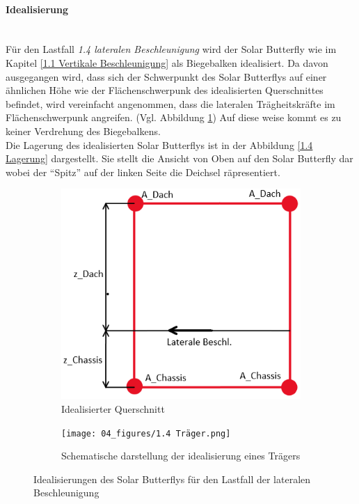   \paragraph{Idealisierung}\mbox{}\\
  Für den Lastfall \emph{1.4 lateralen Beschleunigung} wird der Solar Butterfly wie im Kapitel \ref{1.1 Vertikale Beschleunigung} als Biegebalken idealisiert. Da davon ausgegangen wird, dass sich der Schwerpunkt des Solar Butterflys auf einer ähnlichen Höhe wie der Flächenschwerpunk des idealisierten Querschnittes befindet, wird vereinfacht angenommen, dass die lateralen Trägheitskräfte im Flächenschwerpunk angreifen. (Vgl. Abbildung \ref{1.4 Idealisierter Querschnitt}) Auf diese weise kommt es zu keiner Verdrehung des Biegebalkens.\\
  Die Lagerung des idealisierten Solar Butterflys ist in der Abbildung \ref{1.4 Lagerung} dargestellt. Sie stellt die Ansicht von Oben auf den Solar Butterfly dar wobei der ``Spitz'' auf der linken Seite die Deichsel räpresentiert.

  \begin{figure}[!ht]
    \centering
      \begin{subfigure}{.5\textwidth}
        \centering
        \includegraphics[width=0.8\linewidth]{04_figures/1.4 Querschnitt.png}
        \caption{Idealisierter Querschnitt}
        \label{1.4 Idealisierter Querschnitt}
      \end{subfigure}%
      \begin{subfigure}{.5\textwidth}
        \centering
        \texttt{[image: 04\_figures/1.4 Träger.png]}
        \caption{Schematische darstellung der idealisierung eines Trägers}
        \label{1.4 Träger}
      \end{subfigure}%
    \caption{Idealisierungen des Solar Butterflys für den Lastfall der lateralen Beschleunigung}
  \label{1.4 Idealisierung}
  \end{figure}

